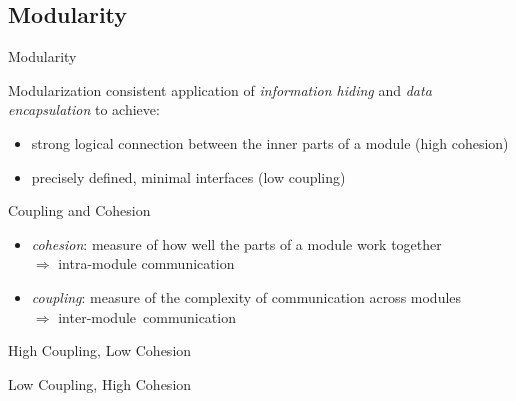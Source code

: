 \subsection{Modularity}
\begin{frame}{Modularity} %
	\begin{mycolumns}[widths={50,50},animation=none]
		\begin{definition}{Modularization}
			consistent application of \emph{information hiding} and \emph{data encapsulation} to achieve:
			\begin{itemize}
				\item strong logical connection between the inner parts of a module (high cohesion)
				\item precisely defined, minimal interfaces (low coupling)
			\end{itemize}						
		\end{definition}
		\pause
		\begin{definition}{Coupling and Cohesion}
			\begin{itemize}
				\item \emph{cohesion}: measure of how well the parts of a module work together\\ $\Rightarrow$ intra-module communication
				\item \emph{coupling}: measure of the complexity of communication across modules\\ $\Rightarrow$ inter-module~communication %
			\end{itemize}
		\end{definition}
	\mynextcolumn
		\vspace{-1cm}
		\begin{exampletight}{High Coupling, Low Cohesion}
			\centering
		\end{exampletight}
		\begin{exampletight}{Low Coupling, High Cohesion}
			\centering
		\end{exampletight}
	\end{mycolumns}
	\begin{mycolumns}[widths={50,50},animation=none]	
	\end{mycolumns}
\end{frame}

